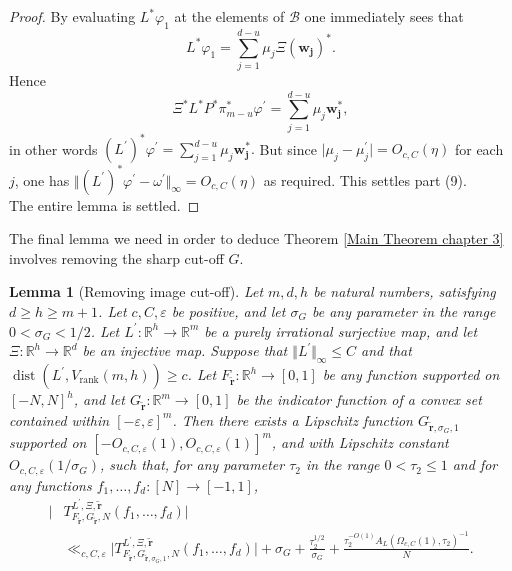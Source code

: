 \documentclass[12pt,a4paper,twoside,reqno]{amsart}
\newtheorem{Lemma}[Theorem]{Lemma}
\newcommand{\rank}{\operatorname{rank}}
\newcommand{\dist}{\operatorname{dist}}
\numberwithin{equation}{section}
\begin{document}
\begin{proof}
By evaluating $L^*\varphi_1$ at the elements of $\mathcal{B}$ one immediately sees that  \[L^*\varphi_1 = \sum\limits_{j=1}^{d-u} \mu_j \Xi(\mathbf{w_j})^*.\] Hence \[\Xi^*L^*P^* \pi_{m-u}^* \varphi^\prime = \sum\limits_{j=1}^{d-u} \mu_j \mathbf{w_j^*},\] in other words $(L^\prime)^* \varphi^\prime = \sum_{j=1}^{d-u}\mu_j \mathbf{w_j^*}.$ But since $\vert \mu_j - \mu_j^\prime\vert = O_{c,C}(\eta)$ for each $j$, one has $\Vert (L^\prime)^* \varphi^\prime - \omega^\prime\Vert_\infty = O_{c,C} (\eta)$ as required. This settles part (9). \\

\noindent The entire lemma is settled. 
\end{proof}


The final lemma we need in order to deduce Theorem \ref{Main Theorem chapter 3} involves removing the sharp cut-off $G$. 

\begin{Lemma}[Removing image cut-off]
\label{Lemma making G lipschitz}
Let $m,d,h$ be natural numbers, satisfying $d\geqslant h\geqslant m+1$. Let $c,C,\varepsilon$ be positive, and let $\sigma_G$ be any parameter in the range $0<\sigma_G<1/2$. Let $L^\prime:\mathbb{R}^h \longrightarrow \mathbb{R}^m$ be a purely irrational surjective map, and let $\Xi:\mathbb{R}^{h} \longrightarrow \mathbb{R}^d$ be an injective map. Suppose that $\Vert L^\prime\Vert_\infty \leqslant C$ and that $\dist(L^\prime, V_{\rank}(m,h)) \geqslant c$. Let $F_{\widetilde{\mathbf{r}}}:\mathbb{R}^h \longrightarrow [0,1]$ be any function supported on $[-N,N]^h$, and let $G_{\widetilde{\mathbf{r}}}:\mathbb{R}^m \longrightarrow [0,1]$ be the indicator function of a convex set contained within $[-\varepsilon,\varepsilon]^m$. Then there exists a Lipschitz function $G_{\widetilde{\mathbf{r}}, \sigma_G,1}$ supported on $[-O_{c,C,\varepsilon}(1),O_{c,C,\varepsilon}(1)]^{m}$, and with Lipschitz constant $O_{c,C,\varepsilon}(1/\sigma _G)$, such that, for any parameter $\tau_2$ in the range $0<\tau_2\leqslant 1$ and for any functions $f_1,\dots,f_d:[N] \longrightarrow [-1,1]$,
\begin{align*}
\vert &T_{F_{\widetilde{\mathbf{r}}},G_{\widetilde{\mathbf{r}}},N}^{L^\prime,\Xi,\widetilde{\mathbf{r}}}(f_1,\dots,f_d)\vert \\ &\ll_{c,C,\varepsilon} \vert T_{F_{\widetilde{\mathbf{r}}},G_{\widetilde{\mathbf{r}},\sigma_G,1},N}^{L^\prime,\Xi,\widetilde{\mathbf{r}}}(f_1,\dots,f_d)\vert + \sigma_G + \frac{\tau_2^{1/2}}{\sigma _G} +  \frac{\tau_2^{-O(1)}A_L(\Omega_{c,C}(1),\tau_2)^{-1}}{N}.
\end{align*}
\end{Lemma}
\end{document}
